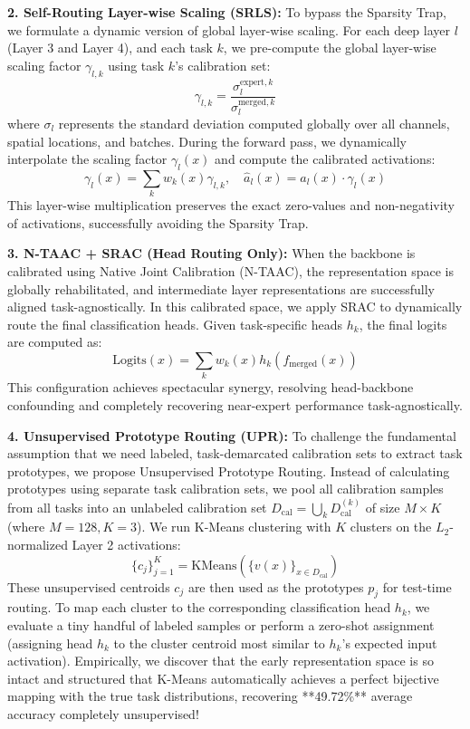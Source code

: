 \documentclass{article}
\theoremstyle{plain}
\theoremstyle{definition}
\theoremstyle{remark}
\begin{document}
\textbf{2. Self-Routing Layer-wise Scaling (SRLS):} To bypass the Sparsity Trap, we formulate a dynamic version of global layer-wise scaling. For each deep layer $l$ (Layer 3 and Layer 4), and each task $k$, we pre-compute the global layer-wise scaling factor $\gamma_{l,k}$ using task $k$'s calibration set:
\begin{equation}
  \gamma_{l,k} = \frac{\sigma_{l}^{\text{expert}, k}}{\sigma_{l}^{\text{merged}, k}}
\end{equation}
where $\sigma_{l}$ represents the standard deviation computed globally over all channels, spatial locations, and batches. During the forward pass, we dynamically interpolate the scaling factor $\gamma_l(x)$ and compute the calibrated activations:
\begin{equation}
  \gamma_l(x) = \sum_{k} w_k(x) \gamma_{l,k}, \quad \hat{a}_l(x) = a_l(x) \cdot \gamma_l(x)
\end{equation}
This layer-wise multiplication preserves the exact zero-values and non-negativity of activations, successfully avoiding the Sparsity Trap.

\textbf{3. N-TAAC + SRAC (Head Routing Only):} When the backbone is calibrated using Native Joint Calibration (N-TAAC), the representation space is globally rehabilitated, and intermediate layer representations are successfully aligned task-agnostically. In this calibrated space, we apply SRAC to dynamically route the final classification heads. Given task-specific heads $h_k$, the final logits are computed as:
\begin{equation}
  \text{Logits}(x) = \sum_{k} w_k(x) h_k(f_{\text{merged}}(x))
\end{equation}
This configuration achieves spectacular synergy, resolving head-backbone confounding and completely recovering near-expert performance task-agnostically.

\textbf{4. Unsupervised Prototype Routing (UPR):} To challenge the fundamental assumption that we need labeled, task-demarcated calibration sets to extract task prototypes, we propose Unsupervised Prototype Routing. Instead of calculating prototypes using separate task calibration sets, we pool all calibration samples from all tasks into an unlabeled calibration set $D_{\text{cal}} = \bigcup_k D_{\text{cal}}^{(k)}$ of size $M \times K$ (where $M=128, K=3$). We run K-Means clustering with $K$ clusters on the $L_2$-normalized Layer 2 activations:
\begin{equation}
  \{c_j\}_{j=1}^K = \text{KMeans}\left( \{v(x)\}_{x \in D_{\text{cal}}} \right)
\end{equation}
These unsupervised centroids $c_j$ are then used as the prototypes $p_j$ for test-time routing. To map each cluster to the corresponding classification head $h_k$, we evaluate a tiny handful of labeled samples or perform a zero-shot assignment (assigning head $h_k$ to the cluster centroid most similar to $h_k$'s expected input activation). Empirically, we discover that the early representation space is so intact and structured that K-Means automatically achieves a perfect bijective mapping with the true task distributions, recovering **49.72\%** average accuracy completely unsupervised!
\end{document}
